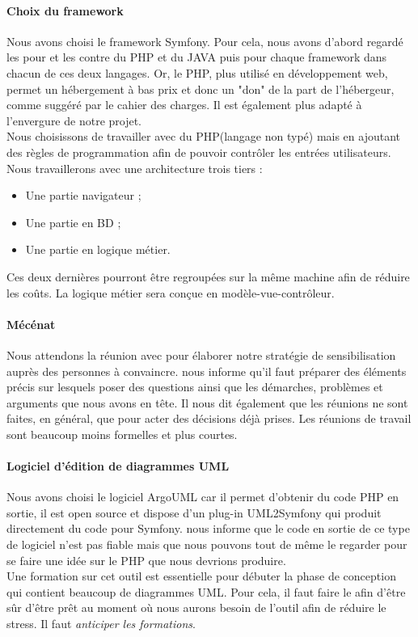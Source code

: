 \documentclass [a4paper] {article}
\begin{document}
\paragraph*{Choix du framework}
Nous avons choisi le framework Symfony. Pour cela, nous avons d'abord regardé les pour et les contre du PHP et du JAVA puis pour chaque framework dans chacun de ces deux langages. Or, le PHP, plus utilisé en développement web, permet un hébergement à bas prix et donc un "don" de la part de l'hébergeur, comme suggéré par le cahier des charges. Il est également plus adapté à l'envergure de notre projet.
\\
Nous choisissons de travailler avec du PHP(langage non typé) mais en ajoutant des règles de programmation afin de pouvoir contrôler les entrées utilisateurs.
\\
Nous travaillerons avec une architecture trois tiers :
\begin{itemize}
\item Une partie navigateur ;
\item Une partie en BD ;
\item Une partie en logique métier.
\end{itemize}
Ces deux dernières pourront être regroupées sur la même machine afin de réduire les coûts. La logique métier sera conçue en modèle-vue-contrôleur.

\paragraph*{Mécénat}
Nous attendons la réunion avec \nomTuteurCom{} pour élaborer notre stratégie de sensibilisation auprès des personnes à convaincre. \nomTuteurPedago{} nous informe qu'il faut préparer des éléments précis sur lesquels poser des questions ainsi que les démarches, problèmes et arguments que nous avons en tête. Il nous dit également que les réunions ne sont faites, en général, que pour acter des décisions déjà prises. Les réunions de travail sont beaucoup moins formelles et plus courtes.

\paragraph*{Logiciel d'édition de diagrammes UML}
Nous avons choisi le logiciel ArgoUML car il permet d'obtenir du code PHP en sortie, il est open source et dispose d'un plug-in UML2Symfony qui produit directement du code pour Symfony. \nomTuteurPedago{} nous informe que le code en sortie de ce type de logiciel n'est pas fiable mais que nous pouvons tout de même le regarder pour se faire une idée sur le PHP que nous devrions produire.
\\
Une formation sur cet outil est essentielle pour débuter la phase de conception qui contient beaucoup de diagrammes UML. Pour cela, il faut faire le \PF{} afin d’être sûr d’être prêt au moment où nous aurons besoin de l'outil afin de réduire le stress. Il faut \emph{anticiper les formations}.
\end{document}
